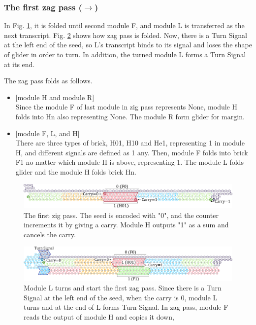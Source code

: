 \documentclass[runningheads]{llncs}
\begin{document}
\subsubsection{The first zag pass ($\rightarrow$)}
In Fig. \ref{fig:counter1stzig}, it is folded until second module F, and module L is transferred as the next transcript.
Fig. \ref{fig:counter1stzag} shows how zag pass is folded.
Now, there is a Turn Signal at the left end of the seed, so L's transcript binds to its signal and loses the shape of glider in order to turn.
In addition, the turned module L forms a Turn Signal at its end.

The zag pass folds as follows.
\begin{itemize}
\item{[module H and module R]} \\Since the module F of last module in zig pass represents None,
module H folds into Hn also representing None. The module R form glider for margin.
\item{[module F, L, and H]} \\There are three types of brick, H01, H10 and He1, representing 1 in module H, and different signals are defined as 1 any. Then, module F folds into brick F1 no matter which module H is above, representing 1. The module L folds glider and the module H folds brick Hn.

\end{itemize}
\begin{figure}[tb]
\centering
\includegraphics[width=\linewidth]{fig/svg/CounterEx5_1.pdf}
\caption{
The first zig pass.
The seed is encoded with "0", and the counter increments it by giving a carry.
Module H outputs "1" as a sum and cancels the carry.
}
\label{fig:counter1stzig}
\end{figure}

\begin{figure}[tb]
\centering
\includegraphics[width=\linewidth]{fig/svg/CounterEx11_1.pdf}
\caption{
Module L turns and start the first zag pass.
Since there is a Turn Signal at the left end of the seed, when the carry is 0, module L turns and at the end of L forms Turn Signal.
In zag pass, module F reads the output of module H and copies it down,
}
\label{fig:counter1stzag}
\end{figure}
\end{document}
